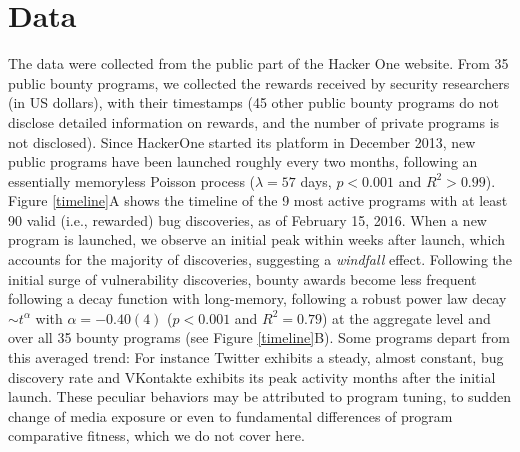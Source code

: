 \section{Data}
\label{sec:data}
The data were collected from the public part of the Hacker One website. From 35 public bounty programs, we collected the rewards received by security researchers (in US dollars), with their timestamps (45 other public bounty programs do not disclose detailed information on rewards, and the number of private programs is not disclosed). Since HackerOne started its platform in December 2013, new public programs have been launched roughly every two months, following an essentially memoryless Poisson process ($\lambda = 57$ days, $p < 0.001$ and $R^2 > 0.99$). Figure \ref{timeline}A shows the timeline of the 9 most active programs with at least 90 valid (i.e., rewarded) bug discoveries, as of February 15, 2016. When a new program is launched, we observe an initial peak within weeks after launch, which accounts for the majority of discoveries, suggesting a {\it windfall} effect. Following the initial surge of vulnerability discoveries, bounty awards become less frequent following a decay function with long-memory, following a robust power law decay $\sim t^{\alpha}$ with $\alpha = -0.40(4)$ ($p < 0.001$ and $R^2 = 0.79$) at the aggregate level and over all 35 bounty programs (see Figure \ref{timeline}B). Some programs depart from this averaged trend: For instance Twitter exhibits a steady, almost constant, bug discovery rate and VKontakte exhibits its peak activity months after the initial launch. These peculiar behaviors may be attributed to program tuning, to sudden change of media exposure or even to fundamental differences of program comparative fitness, which we do not cover here.\\

